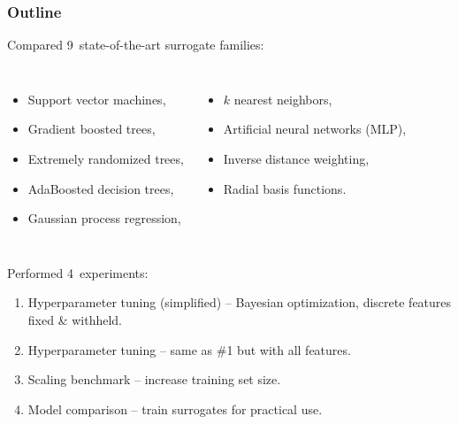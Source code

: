 \begin{frame}
	\frametitle{Outline}
	Compared 9~state-of-the-art surrogate families:

	\begin{columns}
		\begin{itemize}
			\item Support vector machines,
			\item Gradient boosted trees,
			\item Extremely randomized trees,
			\item AdaBoosted decision trees,
			\item Gaussian process regression,
		\end{itemize}

		\begin{itemize}
			\item $k$ nearest neighbors,
			\item Artificial neural networks (MLP),
			\item Inverse distance weighting,
			\item Radial basis functions.
		\end{itemize}
	\end{columns}

	\vspace{2em}

	Performed 4~experiments:
	\begin{enumerate}
		\item
			Hyperparameter tuning (simplified) -- Bayesian optimization,
			discrete features fixed \& withheld.
		\item
			Hyperparameter tuning -- same as \#1 but with all features.
		\item
			Scaling benchmark -- increase training set size.
		\item
			Model comparison -- train surrogates for practical use.
	\end{enumerate}
\end{frame}

